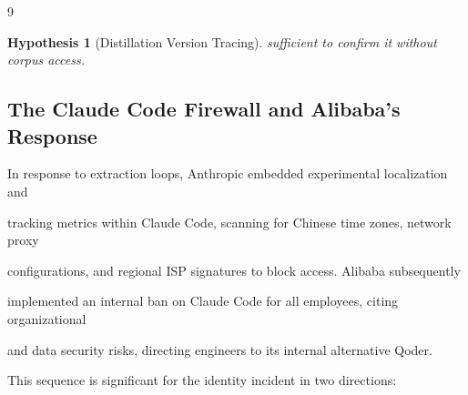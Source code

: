 \documentclass[11pt]{article}
\newtheorem{hypothesis}[theorem]{Hypothesis}
\theoremstyle{definition}
\begin{document}
\begin{thebibliography}{9}
\begin{hypothesis}[Distillation Version Tracing]
sufficient to confirm it without corpus access.





\end{hypothesis}











\subsection{The Claude Code Firewall and Alibaba's Response}











In response to extraction loops, Anthropic embedded experimental localization and





tracking metrics within Claude Code, scanning for Chinese time zones, network proxy





configurations, and regional ISP signatures to block access. Alibaba subsequently





implemented an internal ban on Claude Code for all employees, citing organizational





and data security risks, directing engineers to its internal alternative Qoder.











This sequence is significant for the identity incident in two directions:











\begin{enumerate}






\end{enumerate}
\end{thebibliography}
\end{document}
